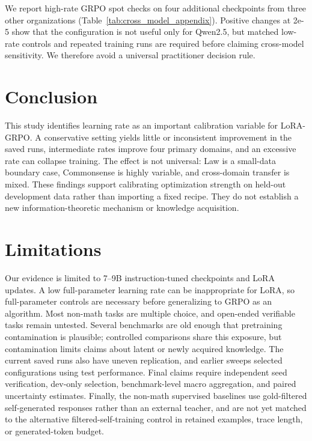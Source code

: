 \documentclass[11pt]{article}
\begin{document}
We report high-rate GRPO spot checks on four additional checkpoints from three other organizations (Table~\ref{tab:cross_model_appendix}). Positive changes at 2e-5 show that the configuration is not useful only for Qwen2.5, but matched low-rate controls and repeated training runs are required before claiming cross-model sensitivity. We therefore avoid a universal practitioner decision rule.

\section{Conclusion}

This study identifies learning rate as an important calibration variable for LoRA-GRPO. A conservative setting yields little or inconsistent improvement in the saved runs, intermediate rates improve four primary domains, and an excessive rate can collapse training. The effect is not universal: Law is a small-data boundary case, Commonsense is highly variable, and cross-domain transfer is mixed. These findings support calibrating optimization strength on held-out development data rather than importing a fixed recipe. They do not establish a new information-theoretic mechanism or knowledge acquisition.

\section*{Limitations}

Our evidence is limited to 7--9B instruction-tuned checkpoints and LoRA updates. A low full-parameter learning rate can be inappropriate for LoRA, so full-parameter controls are necessary before generalizing to GRPO as an algorithm. Most non-math tasks are multiple choice, and open-ended verifiable tasks remain untested. Several benchmarks are old enough that pretraining contamination is plausible; controlled comparisons share this exposure, but contamination limits claims about latent or newly acquired knowledge. The current saved runs also have uneven replication, and earlier sweeps selected configurations using test performance. Final claims require independent seed verification, dev-only selection, benchmark-level macro aggregation, and paired uncertainty estimates. Finally, the non-math supervised baselines use gold-filtered self-generated responses rather than an external teacher, and are not yet matched to the alternative filtered-self-training control in retained examples, trace length, or generated-token budget.
\end{document}
